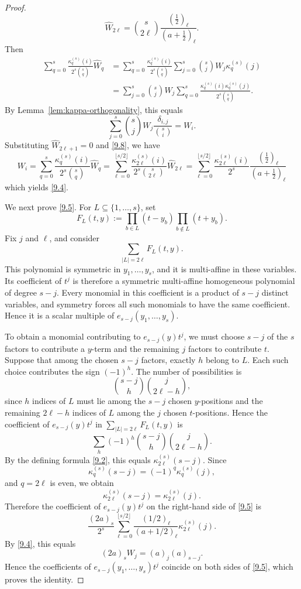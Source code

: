 \documentclass[12pt]{amsart}
\theoremstyle{definition}
\begin{document}
\begin{proof}
\begin{equation}\label{9.8}
\widehat W_{2\ell}
=
\binom{s}{2\ell}
\frac{(\frac12)_\ell}
     {(a+\frac12)_\ell}.
\end{equation}
Then
\[
\begin{aligned}   
\sum_{q=0}^s
\frac{\kappa_q^{(s)}(i)}{2^s\binom{s}{q}}
\widehat W_q
&=
\sum_{q=0}^s
\frac{\kappa_q^{(s)}(i)}{2^s\binom{s}{q}}
\sum_{j=0}^s\binom{s}{j}W_j\kappa_q^{(s)}(j)\\
&=
\sum_{j=0}^s
\binom{s}{j}W_j
\sum_{q=0}^s
\frac{\kappa_q^{(s)}(i)\kappa_q^{(s)}(j)}{2^s\binom{s}{q} }.
\end{aligned}
\]
By Lemma~\ref{lem:kappa-orthogonality},
this equals 
\[
\sum_{j=0}^s
\binom{s}{j}W_j
\frac{\delta_{i,j}}{\binom{s}{i}}=W_i .
\]
Substituting $\widehat W_{2\ell +1} =0$ and  \eqref{9.8},
we have
\[
W_i 
= 
\sum_{q=0}^s
\frac{\kappa_q^{(s)}(i)}{2^s\binom{s}{q}}
\widehat W_q
=
\sum_{\ell=0}^{\lfloor s/2\rfloor}
\frac{\kappa_{2\ell}^{(s)}(i)}{2^s\binom{s}{2\ell}}
\widehat W_{2\ell}
=
\sum_{\ell=0}^{\lfloor s/2\rfloor}
\frac{\kappa_{2\ell}^{(s)}(i)}{2^s}
\frac{(\frac12)_\ell}
     {(a+\frac12)_\ell}
\]
which yields \eqref{9.4}.

We next prove \eqref{9.5}. 
For $L\subseteq\{1,\ldots,s\}$,
set
\[
F_L(t,y)
:=
\prod_{b\in L}(t-y_b)
\prod_{b\notin L}(t+y_b).
\]
Fix \(j\) and \(\ell\), and consider
\[
\sum_{|L|=2\ell}F_L(t,y).
\]
This polynomial is symmetric in \(y_1,\ldots,y_s\), and it is multi-affine in these variables. Its coefficient of \(t^j\) is therefore a symmetric multi-affine homogeneous polynomial of degree \(s-j\). Every monomial in this coefficient is a product of \(s-j\) distinct variables, and symmetry forces all such monomials to have the same coefficient. Hence it is a scalar multiple of \(e_{s-j}(y_1,\ldots,y_s)\).

To obtain a monomial contributing to
\(e_{s-j}(y)t^j\), we must choose \(s-j\) of the
\(s\) factors to contribute a \(y\)-term and the
remaining \(j\) factors to contribute \(t\).
Suppose that among the chosen \(s-j\) factors,
exactly \(h\) belong to \(L\).
Each such choice contributes the sign \((-1)^h\).
The number of possibilities is
\[
\binom{s-j}{h}\binom{j}{2\ell-h},
\]
since \(h\) indices of \(L\) must lie among the
\(s-j\) chosen \(y\)-positions and the remaining
\(2\ell-h\) indices of \(L\) among the \(j\)
chosen \(t\)-positions.
Hence the coefficient of
\(e_{s-j}(y)t^j\) in
$\sum_{|L|=2\ell}F_L(t,y)$
is
\[
\sum_h
(-1)^h
\binom{s-j}{h}
\binom{j}{2\ell-h}.
\]
By the defining formula \eqref{9.2}, this equals
$\kappa_{2\ell}^{(s)}(s-j)$.
Since
\[
\kappa_q^{(s)}(s-j)
=
(-1)^q\kappa_q^{(s)}(j),
\]
and \(q=2\ell\) is even, we obtain
\[
\kappa_{2\ell}^{(s)}(s-j)
=
\kappa_{2\ell}^{(s)}(j).
\]
Therefore the coefficient of
\(e_{s-j}(y)t^j\) on the right-hand side of
\eqref{9.5} is
\[
\frac{(2a)_s}{2^s}
\sum_{\ell=0}^{\lfloor s/2\rfloor}
\frac{(1/2)_\ell}{(a+1/2)_\ell}
\kappa_{2\ell}^{(s)}(j).
\]
By \eqref{9.4}, this equals
\[
(2a)_sW_j
=
(a)_j(a)_{s-j}.
\]
Hence the coefficients of
\(e_{s-j}(y_1,\ldots,y_s)t^j\)
coincide on both sides of \eqref{9.5}, which proves
the identity.
\end{proof}
\end{document}
